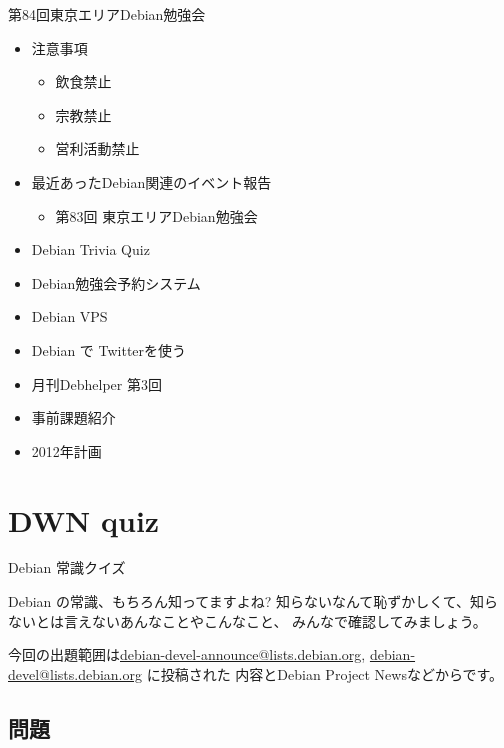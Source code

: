 \begin{frame}{第84回東京エリアDebian勉強会}
\begin{minipage}[t]{0.45\hsize}
  \begin{itemize}
  \item 注意事項
	\begin{itemize}
	 \item 飲食禁止
	 \item 宗教禁止
	 \item 営利活動禁止
	\end{itemize}
   \item 最近あったDebian関連のイベント報告
	\begin{itemize}
        \item 第83回 東京エリアDebian勉強会
	\end{itemize}
 \end{itemize}
\end{minipage} 
\begin{minipage}[t]{0.45\hsize}
 \begin{itemize}
   \item Debian Trivia Quiz
   \item Debian勉強会予約システム
   \item Debian VPS
   \item Debian で Twitterを使う
   \item 月刊Debhelper 第3回
   \item 事前課題紹介
   \item 2012年計画
  \end{itemize}
\end{minipage}
\end{frame}

\section{DWN quiz}
\begin{frame}{Debian 常識クイズ}

Debian の常識、もちろん知ってますよね?
知らないなんて恥ずかしくて、知らないとは言えないあんなことやこんなこと、
みんなで確認してみましょう。

今回の出題範囲は\url{debian-devel-announce@lists.debian.org},
\url{debian-devel@lists.debian.org} に投稿された
内容とDebian Project Newsなどからです。

\end{frame}

\subsection{問題}


